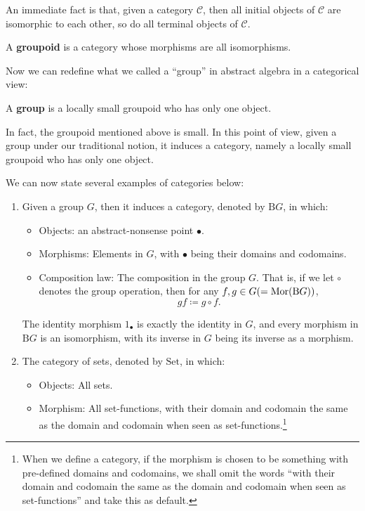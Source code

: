 An immediate fact is that, given a category $\mathcal{C}$, then all initial objects of $\mathcal{C}$ are isomorphic to each other, so do all terminal objects of $\mathcal{C}$.
	\begin{definition}[Groupoid]
	A \textbf{groupoid} is a category whose morphisms are all isomorphisms.
	\end{definition}
	Now we can redefine what we called a ``group'' in abstract algebra in a categorical view:
	\begin{definition}[Group]
	A \textbf{group} is a locally small groupoid who has only one object.
	\end{definition}
	In fact, the groupoid mentioned above is small. In this point of view, given a group under our traditional notion, it induces a category, namely a locally small groupoid who has only one object. 
	\begin{example}
	 We can now state several examples of categories below:
	\begin{enumerate}[label=(\roman*)]
	\item Given a group $G$, then it induces a category, denoted by $\mathrm{B}G$, in which:
		\begin{itemize}
			\item Objects: an abstract-nonsense point $\bullet$.
			\item Morphisms: Elements in $G$, with $\bullet$ being their domains and codomains.
			\item Composition law: The composition in the group $G$. That is, if we let $\circ$ denotes the group operation, then for any $f,g\in G(=\operatorname{Mor}(\mathrm{B}G))$,
			\[gf\coloneqq g\circ f.\]
		\end{itemize}
	The identity morphism $1_\bullet$ is exactly the identity in $G$, and every morphism in $\mathrm{B}G$ is an isomorphism, with its inverse in $G$ being its inverse as a morphism.
	\item The category of sets, denoted by $\mathrm{Set}$, in which:
		\begin{itemize}
			\item Objects: All sets.
			\item Morphism: All set-functions, with their domain  and codomain the same as the domain and codomain when seen as set-functions.\footnote{When we define a category, if the morphism is chosen to be something with pre-defined domains and codomains, we shall omit the words ``with their domain  and codomain the same as the domain and codomain when seen as set-functions'' and take this as default.}

\end{itemize}
\end{enumerate}
\end{example}
